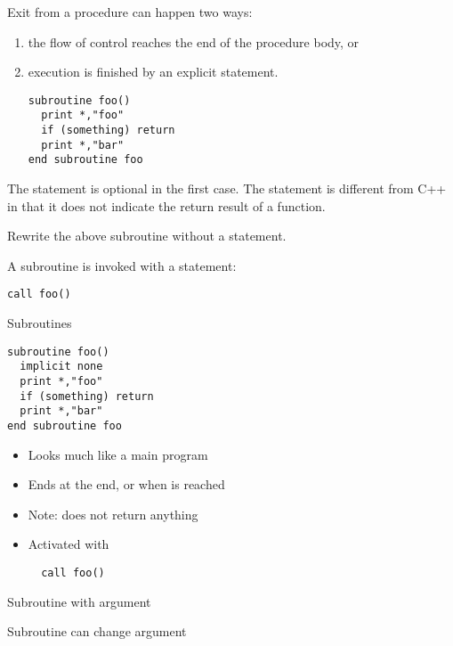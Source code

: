Exit from a procedure can happen two ways:
\begin{enumerate}
\item the flow of control reaches the end of the procedure body, or
\item execution is finished by an explicit 
  statement.
\begin{verbatim}
subroutine foo()
  print *,"foo"
  if (something) return
  print *,"bar"
end subroutine foo
\end{verbatim}
\end{enumerate}
The  statement is optional in the first case.
The  statement is different from C++ in that it does not
indicate the return result of a function.

\begin{exercise}
  Rewrite the above subroutine  without a  statement.
\end{exercise}

A subroutine is invoked with a  statement:
\begin{verbatim}
call foo()
\end{verbatim}

\begin{slide}{Subroutines}
  \label{sl:subroutine}
\begin{verbatim}
subroutine foo()
  implicit none
  print *,"foo"
  if (something) return
  print *,"bar"
end subroutine foo
\end{verbatim}
\begin{itemize}
\item Looks much like a main program
\item Ends at the end, or when  is reached
\item Note:  does not return anything
\item Activated with 
\begin{verbatim}
  call foo()
\end{verbatim}
\end{itemize}
\end{slide}

\begin{block}{Subroutine with argument}
  \label{sl:fsubr-arg}
\end{block}

\begin{block}{Subroutine can change argument}
  \label{sl:fsubr-inout}
\end{block}

